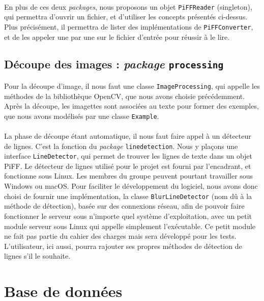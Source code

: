 \paragraph{}
En plus de ces deux \textit{packages}, nous proposons un objet \texttt{PiFFReader} (singleton), qui permettra d'ouvrir un fichier, et d'utiliser les concepts présentés ci-dessus. Plus précisément, il permettra de lister des implémentations de \texttt{PiFFConverter}, et de les appeler une par une sur le fichier d'entrée pour réussir à le lire.

\subsection{Découpe des images : \textit{package} \texttt{processing}}

Pour la découpe d'image, il nous faut une classe \texttt{ImageProcessing}, qui appelle les méthodes de la bibliothèque OpenCV, que nous avons choisie précédemment. Après la découpe, les imagettes sont associées au texte pour former des exemples, que nous avons modélisés par une classe \texttt{Example}. 

\paragraph{}
La phase de découpe étant automatique, il nous faut faire appel à un détecteur de lignes. C'est la fonction du \textit{package} \texttt{linedetection}. Nous y plaçons une interface \texttt{LineDetector}, qui permet de trouver les lignes de texte dans un objet PiFF. Le détecteur de lignes utilisé pour le projet est fourni par l'encadrant, et fonctionne sous Linux. Les membres du groupe peuvent pourtant travailler sous Windows ou macOS. Pour faciliter le développement du logiciel, nous avons donc choisi de fournir une implémentation, la classe \texttt{BlurLineDetector} (nom dû à la méthode de détection), basée sur des connexions réseau, afin de pouvoir faire fonctionner le serveur sous n'importe quel système d'exploitation, avec un petit module serveur sous Linux qui appelle simplement l'exécutable. Ce petit module ne fait pas partie du cahier des charges mais sera développé pour les tests. L'utilisateur, ici aussi, pourra rajouter ses propres méthodes de détection de lignes s'il le souhaite.

\section{Base de données}

